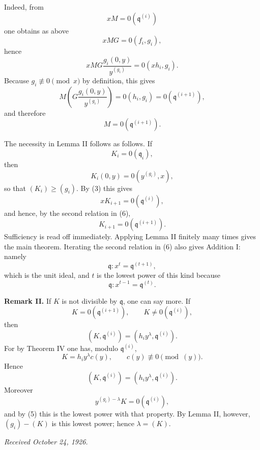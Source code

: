 \documentclass[11pt]{article}
\begin{document}
Indeed, from
\[
  xM=0(\mathfrak q^{(i)})
\]
one obtains as above
\[
  xMG=0(f_i,g_i),
\]
hence
\[
  xMG\frac{g_i(0,y)}{y^{(g_i)}}=0(xh_i,g_i).
\]
Because \(g_i\not\equiv0\pmod{x}\) by definition, this gives
\[
  M\left(G\frac{g_i(0,y)}{y^{(g_i)}}\right)=0(h_i,g_i)=0(\mathfrak q^{(i+1)}),
\]
and therefore
\[
  M=0(\mathfrak q^{(i+1)}).
\]

The necessity in Lemma II follows as follows. If
\[
  K_i=0(\mathfrak q_i),
\]
then
\[
  K_i(0,y)=0(y^{(g_i)},x),
\]
so that \((K_i)\ge(g_i)\). By (3) this gives
\[
  xK_{i+1}=0(\mathfrak q^{(i)}),
\]
and hence, by the second relation in (6),
\[
  K_{i+1}=0(\mathfrak q^{(i+1)}).
\]
Sufficiency is read off immediately. Applying Lemma II finitely many times gives the main theorem. Iterating the second relation in (6) also gives Addition I: namely
\[
  \mathfrak q:x^t=\mathfrak q^{(t+1)},
\]
which is the unit ideal, and \(t\) is the lowest power of this kind because
\[
  \mathfrak q:x^{t-1}=\mathfrak q^{(t)}.
\]

\textbf{Remark II.} If \(K\) is not divisible by \(\mathfrak q\), one can say more. If
\[
  K=0(\mathfrak q^{(i+1)}),
  \qquad
  K\not=0(\mathfrak q^{(i)}),
\]
then
\[
  (K,\mathfrak q^{(i)})=(h_i y^{\lambda},\mathfrak q^{(i)}).
\]
For by Theorem IV one has, modulo \(\mathfrak q^{(i)}\),
\[
  K=h_i y^{\lambda}c(y),
  \qquad
  c(y)\not\equiv0\pmod{(y)}.
\]
Hence
\[
  (K,\mathfrak q^{(i)})=(h_i y^{\lambda},\mathfrak q^{(i)}).
\]
Moreover
\[
  y^{(g_i)-\lambda}K=0(\mathfrak q^{(i)}),
\]
and by (5) this is the lowest power with that property. By Lemma II, however, \((g_i)-(K)\) is this lowest power; hence \(\lambda=(K)\).

\textit{Received October 24, 1926.}
\end{document}
